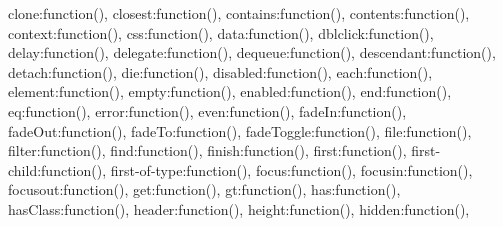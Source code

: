 \textquotesingle{}clone\textquotesingle{}\+:function()\lcurly{}\rcurly{}, \textquotesingle{}closest\textquotesingle{}\+:function()\lcurly{}\rcurly{}, \textquotesingle{}contains\textquotesingle{}\+:function()\lcurly{}\rcurly{}, \textquotesingle{}contents\textquotesingle{}\+:function()\lcurly{}\rcurly{}, \textquotesingle{}context\textquotesingle{}\+:function()\lcurly{}\rcurly{}, \textquotesingle{}css\textquotesingle{}\+:function()\lcurly{}\rcurly{}, \textquotesingle{}data\textquotesingle{}\+:function()\lcurly{}\rcurly{}, \textquotesingle{}dblclick\textquotesingle{}\+:function()\lcurly{}\rcurly{}, \textquotesingle{}delay\textquotesingle{}\+:function()\lcurly{}\rcurly{}, \textquotesingle{}delegate\textquotesingle{}\+:function()\lcurly{}\rcurly{}, \textquotesingle{}dequeue\textquotesingle{}\+:function()\lcurly{}\rcurly{}, \textquotesingle{}descendant\textquotesingle{}\+:function()\lcurly{}\rcurly{}, \textquotesingle{}detach\textquotesingle{}\+:function()\lcurly{}\rcurly{}, \textquotesingle{}die\textquotesingle{}\+:function()\lcurly{}\rcurly{}, \textquotesingle{}disabled\textquotesingle{}\+:function()\lcurly{}\rcurly{}, \textquotesingle{}each\textquotesingle{}\+:function()\lcurly{}\rcurly{}, \textquotesingle{}element\textquotesingle{}\+:function()\lcurly{}\rcurly{}, \textquotesingle{}empty\textquotesingle{}\+:function()\lcurly{}\rcurly{}, \textquotesingle{}enabled\textquotesingle{}\+:function()\lcurly{}\rcurly{}, \textquotesingle{}end\textquotesingle{}\+:function()\lcurly{}\rcurly{}, \textquotesingle{}eq\textquotesingle{}\+:function()\lcurly{}\rcurly{}, \textquotesingle{}error\textquotesingle{}\+:function()\lcurly{}\rcurly{}, \textquotesingle{}even\textquotesingle{}\+:function()\lcurly{}\rcurly{}, \textquotesingle{}fade\+In\textquotesingle{}\+:function()\lcurly{}\rcurly{}, \textquotesingle{}fade\+Out\textquotesingle{}\+:function()\lcurly{}\rcurly{}, \textquotesingle{}fade\+To\textquotesingle{}\+:function()\lcurly{}\rcurly{}, \textquotesingle{}fade\+Toggle\textquotesingle{}\+:function()\lcurly{}\rcurly{}, \textquotesingle{}file\textquotesingle{}\+:function()\lcurly{}\rcurly{}, \textquotesingle{}filter\textquotesingle{}\+:function()\lcurly{}\rcurly{}, \textquotesingle{}find\textquotesingle{}\+:function()\lcurly{}\rcurly{}, \textquotesingle{}finish\textquotesingle{}\+:function()\lcurly{}\rcurly{}, \textquotesingle{}first\textquotesingle{}\+:function()\lcurly{}\rcurly{}, \textquotesingle{}first-\/child\textquotesingle{}\+:function()\lcurly{}\rcurly{}, \textquotesingle{}first-\/of-\/type\textquotesingle{}\+:function()\lcurly{}\rcurly{}, \textquotesingle{}focus\textquotesingle{}\+:function()\lcurly{}\rcurly{}, \textquotesingle{}focusin\textquotesingle{}\+:function()\lcurly{}\rcurly{}, \textquotesingle{}focusout\textquotesingle{}\+:function()\lcurly{}\rcurly{}, \textquotesingle{}get\textquotesingle{}\+:function()\lcurly{}\rcurly{}, \textquotesingle{}gt\textquotesingle{}\+:function()\lcurly{}\rcurly{}, \textquotesingle{}has\textquotesingle{}\+:function()\lcurly{}\rcurly{}, \textquotesingle{}has\+Class\textquotesingle{}\+:function()\lcurly{}\rcurly{}, \textquotesingle{}header\textquotesingle{}\+:function()\lcurly{}\rcurly{}, \textquotesingle{}height\textquotesingle{}\+:function()\lcurly{}\rcurly{}, \textquotesingle{}hidden\textquotesingle{}\+:function()\lcurly{}\rcurly{}, 